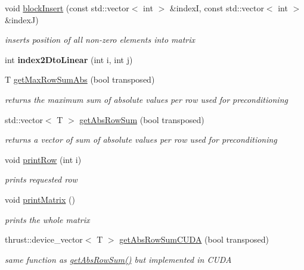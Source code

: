 \begin{DoxyCompactItemize}
void \hyperlink{classflex_matrix_logical_aea3347c0b215b0210ad5c100f32cea50}{block\+Insert} (const std\+::vector$<$ int $>$ \&indexI, const std\+::vector$<$ int $>$ \&indexJ)
\begin{DoxyCompactList}\small\item\em inserts position of all non-\/zero elements into matrix \end{DoxyCompactList}\item 
\mbox{\label{classflex_matrix_logical_a613206c02ddb2de7d984258f307e664f}} 
int {\bfseries index2\+Dto\+Linear} (int i, int j)
\item 
T \hyperlink{classflex_matrix_logical_ab35a9ebf590236184573731bb08e176d}{get\+Max\+Row\+Sum\+Abs} (bool transposed)
\begin{DoxyCompactList}\small\item\em returns the maximum sum of absolute values per row used for preconditioning \end{DoxyCompactList}\item 
std\+::vector$<$ T $>$ \hyperlink{classflex_matrix_logical_a0c7cf2e5dde3a2d55ae95c6e54f94342}{get\+Abs\+Row\+Sum} (bool transposed)
\begin{DoxyCompactList}\small\item\em returns a vector of sum of absolute values per row used for preconditioning \end{DoxyCompactList}\item 
void \hyperlink{classflex_matrix_logical_a27805a561e6e94bdffe965dc8b9a3915}{print\+Row} (int i)
\begin{DoxyCompactList}\small\item\em prints requested row \end{DoxyCompactList}\item 
\mbox{\label{classflex_matrix_logical_a36d592ff72cdd6d52268e3f0cbe38687}} 
void \hyperlink{classflex_matrix_logical_a36d592ff72cdd6d52268e3f0cbe38687}{print\+Matrix} ()
\begin{DoxyCompactList}\small\item\em prints the whole matrix \end{DoxyCompactList}\item 
thrust\+::device\+\_\+vector$<$ T $>$ \hyperlink{classflex_matrix_logical_a0245c73fb7d1fb3b1900208e0deb48d6}{get\+Abs\+Row\+Sum\+C\+U\+DA} (bool transposed)
\begin{DoxyCompactList}\small\item\em same function as \hyperlink{classflex_matrix_logical_a0c7cf2e5dde3a2d55ae95c6e54f94342}{get\+Abs\+Row\+Sum()} but implemented in C\+U\+DA \end{DoxyCompactList}\end{DoxyCompactItemize}
